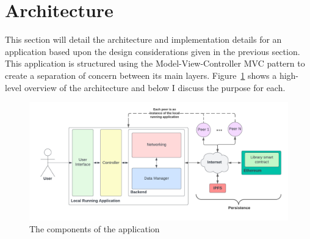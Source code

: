 \section{Architecture}

This section will detail the architecture and implementation details for an application based upon the design considerations given in the previous section.
\x
This application is structured using the Model-View-Controller MVC pattern to create a separation of concern between its main layers. Figure~\ref{fig:impl-layers} shows a high-level overview of the architecture and below I discuss the purpose for each.

\begin{figure}[ht]
  \centering
  \includegraphics[width=\textwidth]{assets/images/diagrams/layers.png}
  \caption{The components of the application}
  \label{fig:impl-layers}
\end{figure}







